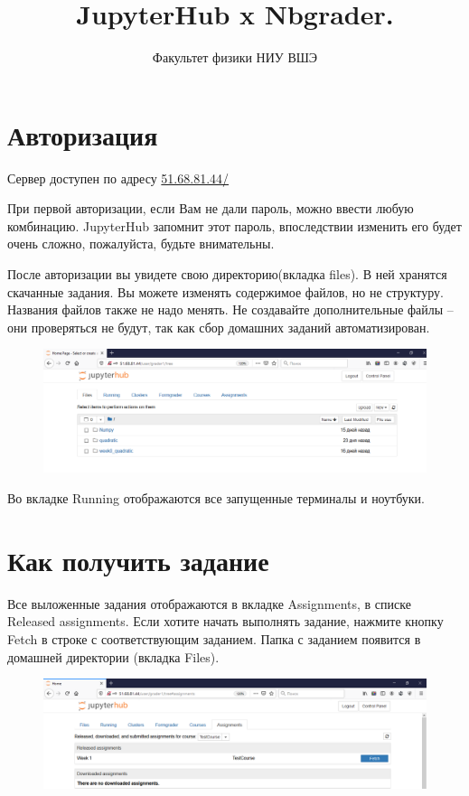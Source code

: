 \documentclass[a4paper,12pt]{article}
\title{JupyterHub x Nbgrader.}
\author{Факультет физики НИУ ВШЭ}
\begin{document}
\maketitle
\tableofcontents
\section{Авторизация} 
Сервер доступен по адресу \url{51.68.81.44/}

 При первой авторизации, если Вам не дали пароль, можно ввести любую комбинацию. JupyterHub запомнит этот пароль, впоследствии изменить его будет очень сложно, пожалуйста, будьте внимательны.

После авторизации вы увидете свою директорию(вкладка files). В ней хранятся скачанные задания. Вы можете изменять содержимое файлов, но не структуру. Названия файлов также не надо менять. Не создавайте дополнительные файлы -- они проверяться не будут, так как сбор домашних заданий автоматизирован.

\begin{figure}[h]
\includegraphics[width=\textwidth]{files}
\end{figure}

Во вкладке Running отображаются все запущенные терминалы и ноутбуки.

\section{Как получить задание}

Все выложенные задания отображаются в вкладке Assignments, в списке Released assignments. Если хотите начать выполнять задание, нажмите кнопку Fetch в строке с соответствующим заданием. Папка с заданием появится в домашней директории (вкладка Files).

\begin{figure}[h]
\includegraphics[width=\textwidth]{fetch}
\end{figure}
\end{document}
